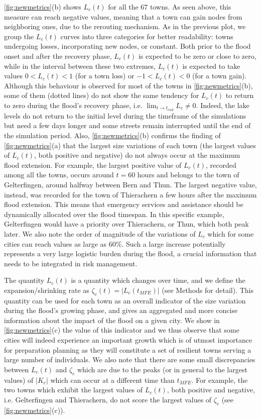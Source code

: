 \documentclass[twocolumn,fleqn,10pt]{wlscirep}
\begin{document}
\cref{fig:newmetrics}(b) shows $L_c(t)$ for all the $67$ towns. As seen above, this measure can reach negative values, meaning that a town can gain nodes from neighboring ones, due to the rerouting mechanism. As in the previous plot, we group the $L_c(t)$ curves into three categories for better readability: towns undergoing losses, incorporating new nodes, or constant. Both prior to the flood onset and after the recovery phase, $L_c(t)$ is expected to be zero or close to zero, while in the interval between these two extremes, $L_c(t)$ is expected to take values $0<L_c(t)<1$ (for a town loss) or $-1<L_c(t)<0$ (for a town gain). Although this behaviour is observed for most of the towns in \cref{fig:newmetrics}(b), some of them (dotted lines) do not show the same tendency for $L_c(t)$ to return to zero during the flood's recovery phase, i.e. $\lim_{t \to t_{end}} L_c \neq 0$.  Indeed, the lake levels do not return to the initial level during the timeframe of the simulations but need a few days longer and some streets remain interrupted until the end of the simulation period. Also, \cref{fig:newmetrics}(b) confirms the finding of \cref{fig:newmetrics}(a) that the largest size variations of each town (the largest values of $L_c(t)$, both positive and negative) do not always occur at the maximum flood extension. For example, the largest positive value of $L_c(t)$, recorded among all the towns, occurs around $t=60$ hours and belongs to the town of Gelterfingen, around halfway between Bern and Thun. The largest negative value, instead, was recorded for the town of Thierachern a few hours after the maximum flood extension. This means that emergency services and assistance should be dynamically allocated over the flood timespan. In this specific example, Gelterfingen would have a priority over Thierachern, or Thun, which both peak later. We also note the order of magnitude of the variations of $L_c$ which for some cities can reach values as large as $60\%$. Such a large increase potentially represents a very large logistic burden during the flood, a crucial information that needs to be integrated in risk management. 

The quantity $L_c(t)$ is a quantity which changes over time, and we define the expansion/shrinking rate as $\zeta_c(t)=|L_c(t_{MFE})|$ (see Methods for detail). This quantity can be used for each town as an overall indicator of the size variation during the flood's growing phase, and gives an aggregated and more concise information about the impact of the flood on a given city. We show in \cref{fig:newmetrics}(c) the value of this indicator and we thus observe that some cities will indeed experience an important growth which is of utmost importance for preparation planning as they will constitute a set of resilient towns serving a large number of individuals. 
We also note that there are some small discrepancies between $L_c(t)$ and $\zeta_c$ which are due to the peaks (or in general to the largest values) of $|K_c|$ which can occur at  a different time than $t_{MFE}$. For example, the two towns which exhibit the largest values of $L_c(t)$, both positive and negative, i.e. Gelterfingen and Thierachern, do not score the largest values of $\zeta_c$ (see \cref{fig:newmetrics}(c)).
\end{document}
